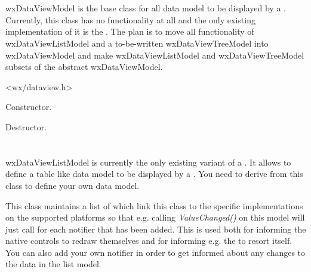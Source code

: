
\section{}\label{wxdataviewmodel}

wxDataViewModel is the base class for all data model to be
displayed by a . 
Currently, this class has no functionality at all and the
only existing implementation of it is the 
. The
plan is to move all functionality of wxDataViewListModel
and a to-be-written wxDataViewTreeModel into wxDataViewModel
and make wxDataViewListModel and wxDataViewTreeModel subsets
of the abstract wxDataViewModel.




<wx/dataview.h>

\label{wxdataviewmodelwxdataviewmodel}


Constructor.

\label{wxdataviewmodeldtor}


Destructor.

\section{}\label{wxdataviewlistmodel}

wxDataViewListModel is currently the only existing variant
of a . It allows
to define a table like data model to be displayed by a
. You need to derive
from this class to define your own data model.

This class maintains a list of 
which link this class to the specific implementations on the
supported platforms so that e.g. calling {\it ValueChanged()}
on this model will just call 
for each notifier that has been added. This is used both for
informing the native controls to redraw themselves and for informing
e.g. the 
to resort itself. You can also add your own notifier in order
to get informed about any changes to the data in the list model.

